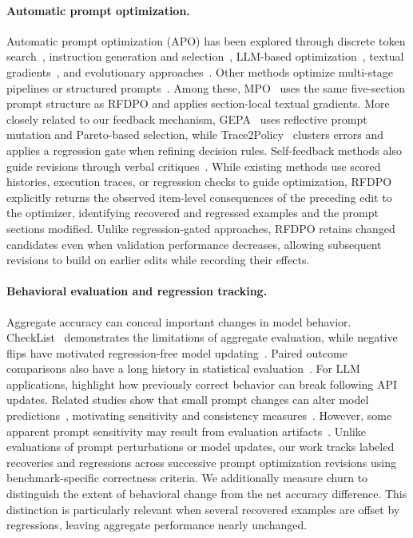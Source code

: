 \documentclass[10pt]{article} %
\begin{document}
\paragraph{Automatic prompt optimization.}
Automatic prompt optimization (APO) has been explored through discrete token search~\citep{shin2020autoprompt}, instruction generation and selection~\citep{zhou2023ape}, LLM-based optimization~\citep{yang2024opro}, textual gradients~\citep{pryzant2023protegi,yuksekgonul2025textgrad}, and evolutionary approaches~\citep{guo2024evoprompt,fernando2024promptbreeder}. Other methods optimize multi-stage pipelines or structured prompts~\citep{opsahlong2024miprov2,schnabel2024sammo,khattab2024dspy}. Among these, MPO~\citep{sharma2026mpo} uses the same five-section prompt structure as RFDPO and applies section-local textual gradients. More closely related to our feedback mechanism, GEPA~\citep{agrawal2026gepa} uses reflective prompt mutation and Pareto-based selection, while Trace2Policy~\citep{zha2026trace2policy} clusters errors and applies a regression gate when refining decision rules. Self-feedback methods also guide revisions through verbal critiques~\citep{madaan2023selfrefine,shinn2023reflexion}. While existing methods use scored histories, execution traces, or regression checks to guide optimization, RFDPO explicitly returns the observed item-level consequences of the preceding edit to the optimizer, identifying recovered and regressed examples and the prompt sections modified. Unlike regression-gated approaches, RFDPO retains changed candidates even when validation performance decreases, allowing subsequent revisions to build on earlier edits while recording their effects.

\paragraph{Behavioral evaluation and regression tracking.}
Aggregate accuracy can conceal important changes in model behavior. CheckList~\citep{ribeiro2020checklist} demonstrates the limitations of aggregate evaluation, while negative flips have motivated regression-free model updating~\citep{yan2021positive}. Paired outcome comparisons also have a long history in statistical evaluation~\citep{mcnemar1947sampling}. For LLM applications, \citet{ma2024regression} highlight how previously correct behavior can break following API updates. Related studies show that small prompt changes can alter model predictions~\citep{salinas2024butterfly}, motivating sensitivity and consistency measures~\citep{errica2025wrong}. However, some apparent prompt sensitivity may result from evaluation artifacts~\citep{hua2025flaw}. Unlike evaluations of prompt perturbations or model updates, our work tracks labeled recoveries and regressions across successive prompt optimization revisions using benchmark-specific correctness criteria. We additionally measure churn to distinguish the extent of behavioral change from the net accuracy difference. This distinction is particularly relevant when several recovered examples are offset by regressions, leaving aggregate performance nearly unchanged.
\end{document}
